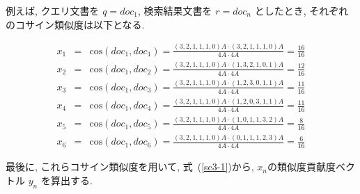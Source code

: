 \documentclass[a4paper,12pt]{jsreport}
\begin{document}
例えば, クエリ文書を $q = doc_1$, 検索結果文書を $r = doc_n$ としたとき, 
それぞれのコサイン類似度は以下となる.

\begin{eqnarray}
x_1 &=& \text{cos}(doc_1, doc_1) = \frac{(3, 2, 1, 1, 1, 0)A \cdot (3, 2, 1, 1, 1, 0)A}{4A \cdot 4A} = \frac{16}{16}\\
x_2 &=& \text{cos}(doc_1, doc_2) = \frac{(3, 2, 1, 1, 1, 0)A \cdot (1, 3, 2, 1, 0, 1)A}{4A \cdot 4A} = \frac{12}{16}\\
x_3 &=& \text{cos}(doc_1, doc_3) = \frac{(3, 2, 1, 1, 1, 0)A \cdot (1, 2, 3, 0, 1, 1)A}{4A \cdot 4A} = \frac{11}{16}\\
x_4 &=& \text{cos}(doc_1, doc_4) = \frac{(3, 2, 1, 1, 1, 0)A \cdot (1, 2, 0, 3, 1, 1)A}{4A \cdot 4A} = \frac{11}{16}\\
x_5 &=& \text{cos}(doc_1, doc_5) = \frac{(3, 2, 1, 1, 1, 0)A \cdot (1, 0, 1, 1, 3, 2)A}{4A \cdot 4A} = \frac{8}{16}\\
x_6 &=& \text{cos}(doc_1, doc_6) = \frac{(3, 2, 1, 1, 1, 0)A \cdot (0, 1, 1, 1, 2, 3)A}{4A \cdot 4A} = \frac{6}{16}
\label{sc3-7}
\end{eqnarray}

最後に, これらコサイン類似度を用いて, 式~(\ref{sc3-1})から, 
$x_n$の類似度貢献度ベクトル $y_n$ を算出する.
\end{document}

